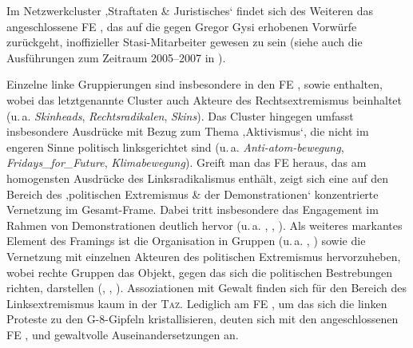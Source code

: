 Im Netzwerkcluster ‚Straftaten \& Juristisches` findet sich des Weiteren das angeschlossene FE , das auf die gegen Gregor Gysi erhobenen Vorwürfe zurückgeht, inoffizieller Stasi-Mitarbeiter gewesen zu sein (siehe auch die Ausführungen zum Zeitraum 2005--2007 in ).

Einzelne linke Gruppierungen sind insbesondere in den FE ,  sowie  enthalten, wobei das letztgenannte Cluster auch Akteure des Rechtsextremismus beinhaltet (u.\,a. \emph{Skinheads}, \emph{Rechtsradikalen}, \emph{Skins}). Das Cluster  hingegen umfasst insbesondere Ausdrücke mit Bezug zum Thema ‚Aktivismus`, die nicht im engeren Sinne politisch linksgerichtet sind (u.\,a. \emph{Anti-atom-bewegung}, \emph{Fridays\_for\_Future}, \emph{Klimabewegung}). Greift man das FE  heraus, das am homogensten Ausdrücke des Linksradikalismus enthält, zeigt sich eine auf den Bereich des ‚politischen Extremismus \& der Demonstrationen` konzentrierte Vernetzung im Gesamt-Frame. Dabei tritt insbesondere das Engagement im Rahmen von Demonstrationen deutlich hervor (u.\,a. , , ). Als weiteres markantes Element des Framings ist die Organisation in Gruppen (u.\,a. , ) sowie die Vernetzung mit einzelnen Akteuren des politischen Extremismus hervorzuheben, wobei rechte Gruppen das Objekt, gegen das sich die politischen Bestrebungen richten, darstellen (, , ). Assoziationen mit Gewalt finden sich für den Bereich des Linksextremismus kaum in der \textsc{Taz}. Lediglich am FE , um das sich die linken Proteste zu den G-8-Gipfeln kristallisieren, deuten sich mit den angeschlossenen FE ,  und  gewaltvolle Auseinandersetzungen an.

